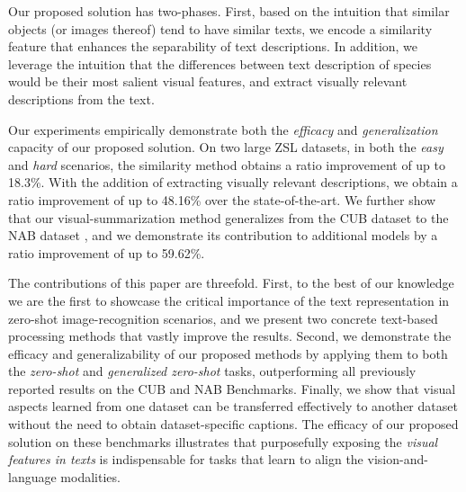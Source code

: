 \documentclass[11pt,a4paper]{article}
\newcommand\gal[1]{\textcolor{bright}{\textbf{GAL:} #1 }}
\newcommand\reut[1]{\textcolor{green}{\textbf{REUT:} #1 }}
\begin{document}
Our proposed solution has two-phases. First,
based on the intuition that similar objects (or images thereof) tend to have similar texts, %
we encode a similarity feature that enhances the separability of text descriptions. %
In addition, we leverage the intuition that the differences between text description of species would be their most salient visual features, and extract visually relevant descriptions from the text.



Our experiments empirically demonstrate both the {\em efficacy} and {\em generalization} capacity of our proposed solution. 
On two large ZSL datasets, %
in both the {\em easy} and {\em hard} scenarios, the similarity method obtains a ratio improvement of up to 18.3\%. With the addition of extracting visually relevant descriptions, we obtain a ratio improvement of up to 48.16\% over the state-of-the-art.
We further show that our visual-summarization method generalizes from the CUB dataset \citep{wah2011caltech} to the NAB dataset \citep{van2015building}, and we demonstrate its contribution to additional models by a ratio improvement of up to 59.62\%.



The contributions of this paper are threefold.
First, to the best of our knowledge we are the first to showcase the critical importance of the text representation in zero-shot image-recognition scenarios, and we present two concrete text-based processing methods that vastly improve the results.
Second, we demonstrate the efficacy and generalizability of our proposed methods by applying them to both the {\em zero-shot} and {\em generalized zero-shot} tasks, outperforming all previously reported results on the CUB and NAB Benchmarks. %
Finally, we show that visual aspects learned from one dataset can be transferred effectively to another dataset without the need to obtain dataset-specific captions. 
The efficacy of our proposed solution on these benchmarks illustrates that purposefully exposing the {\em visual features in texts} is indispensable for tasks that learn to align the vision-and-language modalities. %
\end{document}
